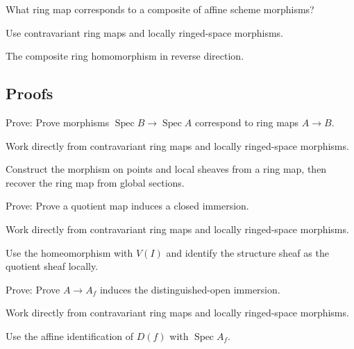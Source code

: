\begin{exercise}[Composition]\label{exr:vi19-expand-05}
What ring map corresponds to a composite of affine scheme morphisms?
\end{exercise}
\begin{hint}
Use contravariant ring maps and locally ringed-space morphisms.
\end{hint}
\begin{solution}
The composite ring homomorphism in reverse direction.
\end{solution}

\subsection*{Proofs}

\begin{exercise}\label{exr:vi19-expand-06}
Prove: Prove morphisms $\operatorname{Spec}B\to\operatorname{Spec}A$ correspond to ring maps $A\to B$.
\end{exercise}
\begin{hint}
Work directly from contravariant ring maps and locally ringed-space morphisms.
\end{hint}
\begin{solution}
Construct the morphism on points and local sheaves from a ring map, then recover the ring map from global sections.
\end{solution}

\begin{exercise}\label{exr:vi19-expand-07}
Prove: Prove a quotient map induces a closed immersion.
\end{exercise}
\begin{hint}
Work directly from contravariant ring maps and locally ringed-space morphisms.
\end{hint}
\begin{solution}
Use the homeomorphism with $V(I)$ and identify the structure sheaf as the quotient sheaf locally.
\end{solution}

\begin{exercise}\label{exr:vi19-expand-08}
Prove: Prove $A\to A_f$ induces the distinguished-open immersion.
\end{exercise}
\begin{hint}
Work directly from contravariant ring maps and locally ringed-space morphisms.
\end{hint}
\begin{solution}
Use the affine identification of $D(f)$ with $\operatorname{Spec}A_f$.
\end{solution}

